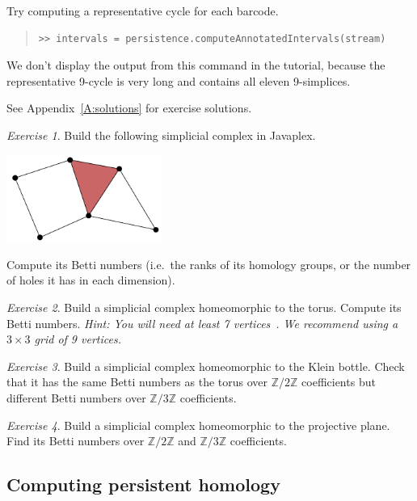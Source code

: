 \documentclass[amscd, amssymb, verbatim]{amsart}[12pt]
\theoremstyle{remark}
\newtheorem{exercise}{Exercise}
\theoremstyle{remark}
\theoremstyle{remark}
\newcommand{\Z}{\mathbb{Z}}
\begin{document}
Try computing a representative cycle for each barcode.

\begin{quote} \begin{verbatim}
>> intervals = persistence.computeAnnotatedIntervals(stream)
\end{verbatim} \end{quote}

We don't display the output from this command in the tutorial, because the representative 9-cycle is very long and contains all eleven 9-simplices.

See Appendix~\ref{A:solutions} for exercise solutions. 

\begin{exercise}
Build the following simplicial complex in Javaplex.
\begin{center}
\includegraphics[width=2in]{smallSimplicialComplex.png}
\end{center}
Compute its Betti numbers (i.e.\ the ranks of its homology groups, or the number of holes it has in each dimension).
\end{exercise}

\begin{exercise}
Build a simplicial complex homeomorphic to the torus. Compute its Betti numbers. {\em Hint: You will need at least 7 vertices}~\citep[page 107]{Hatcher}{\em . We recommend using a $3\times 3$ grid of 9 vertices.} 
\end{exercise}

\begin{exercise}
Build a simplicial complex homeomorphic to the Klein bottle. Check that it has the same Betti numbers as the torus over $\Z/2\Z$ coefficients but different Betti numbers over $\Z/3\Z$ coefficients. 
\end{exercise}

\begin{exercise}
Build a simplicial complex homeomorphic to the projective plane. Find its Betti numbers over $\Z/2\Z$ and $\Z/3\Z$ coefficients. 
\end{exercise}


\subsection{Computing persistent homology}\label{S:computingPersistentHomology}
\end{document}
